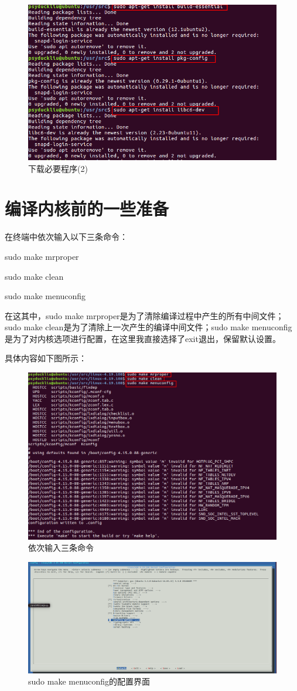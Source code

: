 \documentclass[11pt,a4paper]{article}
\begin{document}
	\begin{figure}[h]
		\centering
		\includegraphics[width=0.7\linewidth]{Pictures/8_WPS}
		\caption{下载必要程序(2)}
		\label{fig:8wps}
	\end{figure}

	\section{编译内核前的一些准备}
	在终端中依次输入以下三条命令：\par
	sudo make mrproper\par 
	sudo make clean \par
	sudo make menuconfig\par
	在这其中，sudo make mrproper是为了清除编译过程中产生的所有中间文件；sudo make clean是为了清除上一次产生的编译中间文件；sudo make menuconfig是为了对内核选项进行配置，在这里我直接选择了exit退出，保留默认设置。\par
	具体内容如下图所示：
	\newpage
	\begin{figure}[h]
		\centering
		\includegraphics[width=0.7\linewidth]{Pictures/15_WPS}
		\caption{依次输入三条命令}
		\label{fig:15wps}
	\end{figure}
	\begin{figure}[h]
		\centering
		\includegraphics[width=0.7\linewidth]{Pictures/14}
		\caption{sudo make menuconfig的配置界面}
		\label{fig:14}
	\end{figure}
	
\end{document}
